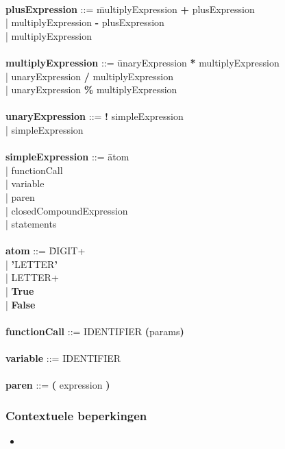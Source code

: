 \begin{tabbing}
            \\ 
            {\bf plusExpression}              ::= \=multiplyExpression \textbf{+} plusExpression\\
                                                  \>| multiplyExpression \textbf{-} plusExpression\\
                                                  \>| multiplyExpression\\
            \\
            {\bf multiplyExpression}          ::= \=unaryExpression \textbf{*} multiplyExpression\\
                                                  \>| unaryExpression \textbf{/} multiplyExpression\\
                                                  \>| unaryExpression \textbf{\%} multiplyExpression\\
            \\
            {\bf unaryExpression}             ::= \=\textbf{!} simpleExpression\\
                                                  \>| simpleExpression\\ 
            \\   
            {\bf simpleExpression}            ::= \=atom\\
                                                  \>| functionCall\\
                                                  \>| variable\\
                                                  \>| paren\\
                                                  \>| closedCompoundExpression\\
                                                  \>| statements\\
            \\
            {\bf atom}                        ::= \=DIGIT+\\
                                                  \>| \textbf{'}LETTER\textbf{'}\\
                                                  \>| LETTER+\\
                                                  \>| \textbf{True}\\
                                                  \>| \textbf{False}\\
            \\   
            {\bf functionCall}                ::= IDENTIFIER \textbf{(}params\textbf{)} \\
            \\      
            {\bf variable}                    ::= IDENTIFIER \\
            \\ 
            {\bf paren}                       ::= \textbf{(} expression \textbf{)}\\
        \end{tabbing}
    \subsubsection{Contextuele beperkingen}
        \begin{itemize}
        \item 
        \end{itemize}
